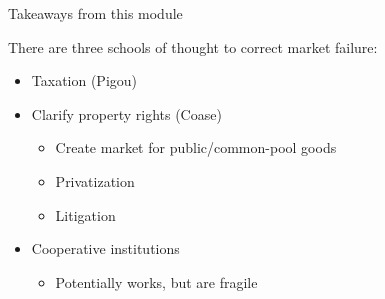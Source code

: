 \begin{frame}{Takeaways from this module}
\protect\hypertarget{takeaways-from-this-module}{}

There are three schools of thought to correct market failure:

\begin{itemize}
\tightlist
\item
  Taxation (Pigou)
\item
  Clarify property rights (Coase)

  \begin{itemize}
  \tightlist
  \item
    Create market for public/common-pool goods
  \item
    Privatization
  \item
    Litigation
  \end{itemize}
\item
  Cooperative institutions

  \begin{itemize}
  \tightlist
  \item
    Potentially works, but are fragile
  \end{itemize}
\end{itemize}

\end{frame}
